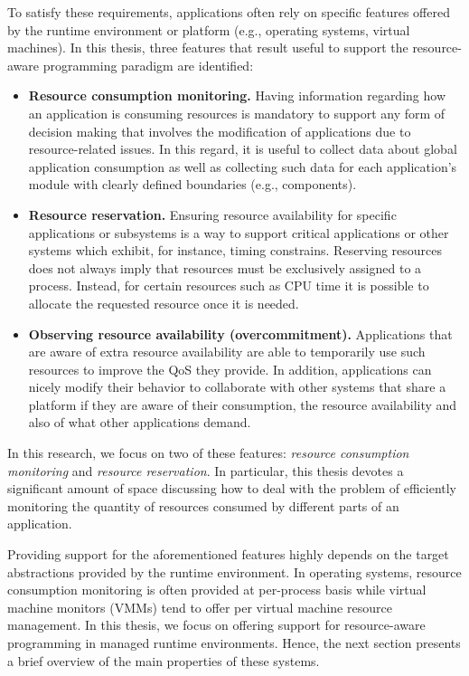 To satisfy these requirements, applications often rely on specific features offered by the runtime environment or platform (e.g., operating systems, virtual machines).
In this thesis, three features that result useful to support the resource-aware programming paradigm are identified:

\begin{itemize}
\item \textbf{Resource consumption monitoring.}
Having information regarding how an application is consuming resources is mandatory to support any form of decision making that involves the modification of applications due to resource-related issues. 
In this regard, it is useful to collect data about global application consumption as well as collecting such data for each application's module with clearly defined boundaries (e.g., components).

\item \textbf{Resource reservation.}
Ensuring resource availability for specific applications or subsystems is a way to support critical applications or other systems which exhibit, for instance, timing constrains.
Reserving resources does not always imply that resources must be exclusively assigned to a process.
Instead, for certain resources such as CPU time it is possible to allocate the requested resource once it is needed.

\item \textbf{Observing resource availability (overcommitment).} 
Applications that are aware of extra resource availability are able to temporarily use such resources to improve the QoS they provide.
In addition, applications can nicely modify their behavior to collaborate with other systems that share a platform if they are aware of their consumption, the resource availability and also of what other applications demand.
\end{itemize}

In this research, we focus on two of these features: \textit{resource consumption monitoring} and \textit{resource reservation}.
In particular, this thesis devotes a significant amount of space discussing how to deal with the problem of efficiently monitoring the quantity of resources consumed by different parts of an application.

%
%

Providing support for the aforementioned features highly depends on the target abstractions provided by the runtime environment.
In operating systems, resource consumption monitoring is often provided at per-process basis while
virtual machine monitors (VMMs) tend to offer per virtual machine resource management.
In this thesis, we focus on offering support for resource-aware programming in managed runtime environments.
Hence, the next section presents a brief overview of the main properties of these systems. 

